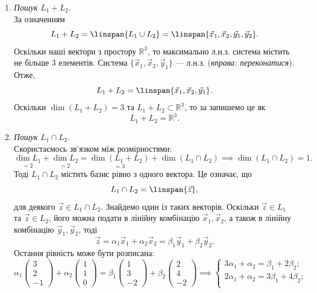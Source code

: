 \documentclass{math_library}
\begin{document}
\begin{example}
	\begin{enumerate}[wide=0pt,label={\Roman*.}]
	\item \textit{Пошук $L_1+L_2$}.\\
	За означенням
	\[
	L_1 + L_2 = \linspan\{L_1 \cup L_2\} = \linspan\{\vec{x}_1, \vec{x}_2, \vec{y}_1, \vec{y}_2\}.
	\]
	Оскільки наші вектори з простору $\mathbb{R}^3$, то максимально л.н.з. система містить не більше $3$ елементів. Система $\{\vec{x}_1, \vec{x}_2, \vec{y}_1\}$ --- л.н.з. (\textit{вправа: переконатися}). Отже, 
	\[
	L_1 + L_2 = \linspan\{\vec{x}_1, \vec{x}_2, \vec{y}_1 \}.
	\]
	Оскільки $\dim (L_1 + L_2) = 3$ та $L_1 + L_2 \subset \mathbb{R}^3$, то за  запишемо це як
	\[
	L_1+L_2= \mathbb{R}^3.
	\]
	\item \textit{Пошук $L_1 \cap L_2$}.\\
	Скористаємось зв'язком між розмірностями:
	\[
	\underset{=2}{\dim L_1} + \underset{=2}{\dim L_2} = \underset{=3}{\dim (L_1+L_2)} + \dim(L_1 \cap L_2) \implies \dim (L_1 \cap L_2) = 1.
	\]
	Тоді $L_1 \cap L_2$ містить базис рівно з одного вектора. Це означає, що 
	\[
	L_1 \cap L_2 = \linspan\{\vec{z}\},
	\]
	для деякого $\vec{z} \in L_1 \cap L_2$. Знайдемо один із таких векторів. Оскільки $\vec{z} \in L_1$ та $\vec{z} \in L_2$, його можна подати в лінійну комбінацію $\vec{x}_1,\vec{x}_2$, а також в лінійну комбінацію $\vec{y}_1,\vec{y}_2$, тоді
	\[
	\vec{z} = \alpha_1 \vec{x}_1 + \alpha_2 \vec{x}_2 = \beta_1 \vec{y}_1 + \beta_2 \vec{y}_2.
	\]
	Остання рівність може бути розписана:
	\[
	\alpha_1 \begin{pmatrix} 3 \\ 2 \\ -1 \end{pmatrix} + \alpha_2 \begin{pmatrix} 1 \\ 1 \\ 0 \end{pmatrix} = \beta_1 \begin{pmatrix} 1 \\ 3 \\ -2 \end{pmatrix} + \beta_2 \begin{pmatrix} 2 \\ 4 \\ -2 \end{pmatrix}
	\implies \begin{cases}
	3 \alpha_1 + \alpha_2 = \beta_1 + 2 \beta_2; \\
	2 \alpha_1 + \alpha_2 = 3 \beta_1 + 4 \beta_2; \\

\end{cases}\]
\end{enumerate}
\end{example}
\end{document}
